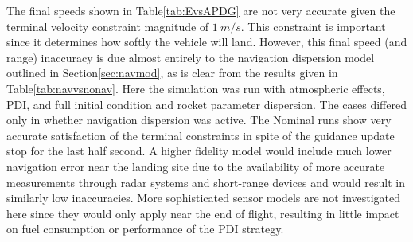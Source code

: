 The final speeds shown in Table\:\ref{tab:EvsAPDG} are not very accurate given the terminal velocity constraint magnitude of $1\:m/s$. This constraint is important since it determines how softly the vehicle will land. However, this final speed (and range) inaccuracy is due almost entirely to the navigation dispersion model outlined in Section\:\ref{sec:navmod}, as is clear from the results given in Table\:\ref{tab:navvsnonav}. Here the simulation was run with atmospheric effects, PDI, and full initial condition and rocket parameter dispersion. The cases differed only in whether navigation dispersion was active. The Nominal runs show very accurate satisfaction of the terminal constraints in spite of the guidance update stop for the last half second. A higher fidelity model would include much lower navigation error near the landing site due to the availability of more accurate measurements through radar systems and short-range devices and would result in similarly low inaccuracies. More sophisticated sensor models are not investigated here since they would only apply near the end of flight, resulting in little impact on fuel consumption or performance of the PDI strategy.

